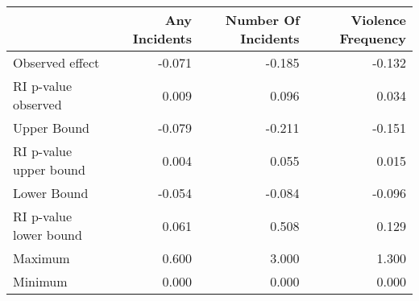 
\begin{tabular}{l|r|r|r}
\hline
  & Any Incidents & Number Of Incidents & Violence Frequency\\
\hline
Observed effect & -0.071 & -0.185 & -0.132\\
\hline
RI p-value observed & 0.009 & 0.096 & 0.034\\
\hline
Upper Bound & -0.079 & -0.211 & -0.151\\
\hline
RI p-value upper bound & 0.004 & 0.055 & 0.015\\
\hline
Lower Bound & -0.054 & -0.084 & -0.096\\
\hline
RI p-value lower bound & 0.061 & 0.508 & 0.129\\
\hline
Maximum & 0.600 & 3.000 & 1.300\\
\hline
Minimum & 0.000 & 0.000 & 0.000\\
\hline
\end{tabular}
